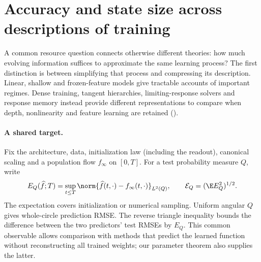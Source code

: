 \section{Accuracy and state size across descriptions of training}
\label{sec:resources}

A common resource question connects otherwise different theories: how much
evolving information suffices to approximate the same learning process?
The first distinction is between simplifying that process and compressing its
description.  Linear, shallow and frozen-feature models give tractable accounts
of important regimes.  Dense training, tangent hierarchies, limiting-response
solvers and response memory instead provide different representations to compare
when depth, nonlinearity and feature learning are retained
().

\paragraph{A shared target.}
Fix the architecture, data, initialization law (including the readout), canonical
scaling and a population flow $f_\infty$ on $[0,T]$.  For a test probability
measure $Q$, write
\begin{equation}
 E_Q(\widehat f;T)=\sup_{t\le T}
 \norm{\widehat f(t,\cdot)-f_\infty(t,\cdot)}_{L^2(Q)},\qquad
 \mathcal E_Q=(\E E_Q^2)^{1/2}.
 \label{eq:resource-error}
\end{equation}
The expectation covers initialization or numerical sampling.  Uniform angular
$Q$ gives whole-circle prediction RMSE.  The reverse triangle inequality bounds
the difference between the two predictors' test RMSEs by $E_Q$.
This common observable allows comparison with methods that predict the learned
function without reconstructing all trained weights; our parameter theorem
also supplies the latter.

